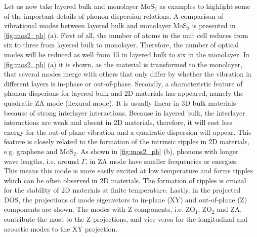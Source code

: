 Let us now take layered bulk and monolayer MoS$_2$ as examples to highlight some of the important details of phonon dispersion relations. A comparison of vibrational modes between layered bulk and monolayer MoS$_2$ is presented in \autoref{fig:mos2_ph} (a). First of all, the number of atoms in the unit cell reduces from six to three from layered bulk to monolayer. Therefore, the number of optical modes will be reduced as well from 15 in layered bulk to six in the monolayer. In \autoref{fig:mos2_ph} (a) it is shown, as the material is transformed to the monolayer, that several modes merge with others that only differ by whether the vibration in different layers is in-phase or out-of-phase. Secondly, a characteristic feature of phonon disperions for layered bulk and 2D materials has appeared, namely the quadratic ZA mode (flexural mode). It is usually linear in 3D bulk materials because of strong interlayer interactions. Because in layered bulk, the interlayer interactions are weak and absent in 2D materials, therefore, it will cost less energy for the out-of-plane vibration and a quadratic dispersion will appear\cite{kittel}. This feature is closely related to the formation of the intrinsic ripples in 2D materials, e.g. graphene\cite{neek} and MoS$_2$\cite{mos2-ripple}. As shown in \autoref{fig:mos2_ph} (b), phonons with longer wave lengths, i.e. around $\Gamma$, in ZA mode have smaller frequencies or energies. This means this mode is more easily excited at low temperature and forms ripples which can be often observed in 2D materials. The formation of ripples is crucial for the stability of 2D materials at finite temperature. Lastly, in the projected DOS, the projections of mode eigenvetors to in-plane (XY) and out-of-plane (Z) components are shown. The modes with Z components, i.e. ZO$_1$, ZO$_2$ and ZA, contribute the most to the Z projections, and vice versa for the longitudinal and acoustic modes to the XY projection. 

